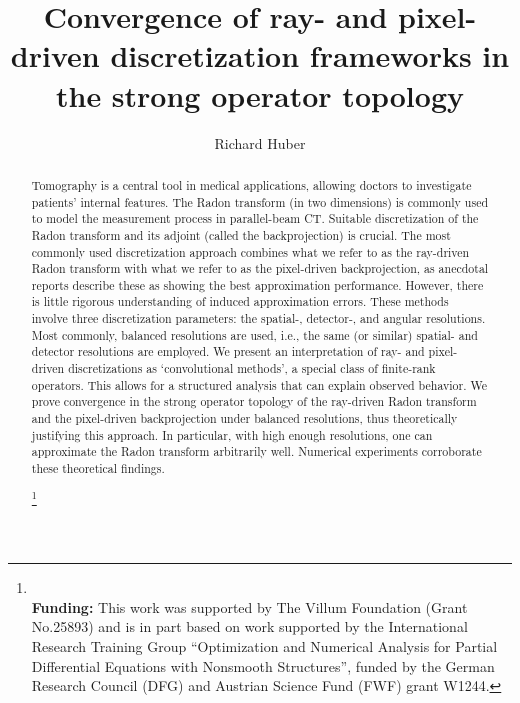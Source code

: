 \documentclass[11pt,reqno]{amsart}
\numberwithin{theorem}{section}
\theoremstyle{remark}
\begin{document}
%
\title[Convergence of ray- and pixel-driven discretizations]{Convergence of ray- and pixel-driven discretization frameworks in the strong operator topology}


%
%
\author[R. Huber]{Richard Huber}
\address{ IDea Lab - The Interdisciplinary Digital Lab at the University of Graz\\
University of Graz, Graz, Austria
}
%


%
\begin{abstract}
Tomography is a central tool in medical applications, allowing doctors to investigate patients' internal features. The Radon transform (in two dimensions) is commonly used to model the measurement process in parallel-beam CT. Suitable discretization of the Radon transform and its adjoint (called the backprojection) is crucial.
The most commonly used discretization approach combines what we refer to as the ray-driven Radon transform with what we refer to as the pixel-driven backprojection, as anecdotal reports describe these as showing the best approximation performance. However, there is little rigorous understanding of induced approximation errors.
These methods involve three discretization parameters: the spatial-, detector-, and angular resolutions. Most commonly, balanced resolutions are used, i.e., the same (or similar) spatial- and detector resolutions are employed.
We present an interpretation of ray- and pixel-driven discretizations as `convolutional methods', a special class of finite-rank operators.
This allows for a structured analysis that can explain observed behavior.
We prove convergence in the strong operator topology of the ray-driven Radon transform and the pixel-driven backprojection under balanced resolutions, thus theoretically justifying this approach. In particular, with high enough resolutions, one can approximate the Radon transform arbitrarily well. Numerical experiments corroborate these theoretical findings.


\thanks{\\ \textbf{Funding:} This work was supported by The Villum Foundation (Grant No.25893) and is in part based on work supported by the International Research Training Group ``Optimization and Numerical Analysis for Partial Differential Equations with Nonsmooth Structures'', funded by the German Research Council (DFG) and Austrian Science Fund (FWF) grant W1244.
}



\end{abstract}
\subjclass{  44A12, %
  65R10, %
  94A08, %
  41A25.  %
}
\maketitle
%
%
%
\end{document}
